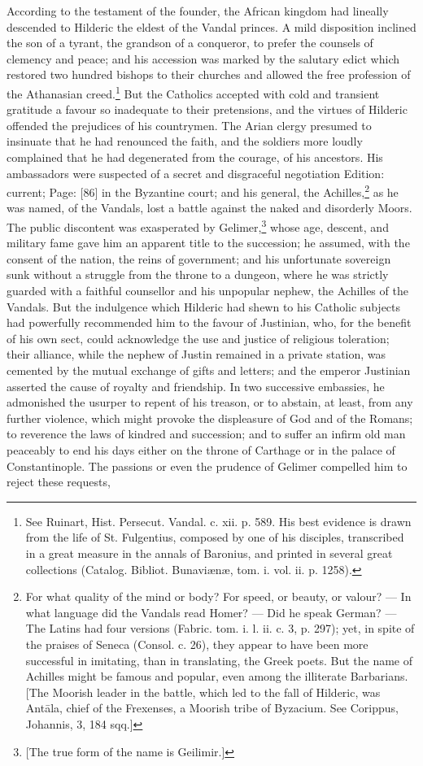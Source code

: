 According to the testament of the founder, the African kingdom had lineally descended to Hilderic the eldest of the Vandal princes. A mild disposition inclined the son of a tyrant, the grandson of a conqueror, to prefer the counsels of clemency and peace; and his accession was marked by the salutary edict which restored two hundred bishops to their churches and allowed the free profession of the Athanasian creed.\footnote{See Ruinart, Hist. Persecut. Vandal. c. xii. p. 589. His best evidence is drawn from the life of St. Fulgentius, composed by one of his disciples, transcribed in a great measure in the annals of Baronius, and printed in several great collections (Catalog. Bibliot. Bunaviænæ, tom. i. vol. ii. p. 1258).} But the Catholics accepted with cold and transient gratitude a favour so inadequate to their pretensions, and the virtues of Hilderic offended the prejudices of his countrymen. The Arian clergy presumed to insinuate that he had renounced the faith, and the soldiers more loudly complained that he had degenerated from the courage, of his ancestors. His ambassadors were suspected of a secret and disgraceful negotiation Edition: current; Page: [86] in the Byzantine court; and his general, the Achilles,\footnote{For what quality of the mind or body? For speed, or beauty, or valour? \texthebrew{—} In what language did the Vandals read Homer? \texthebrew{—} Did he speak German? \texthebrew{—} The Latins had four versions (Fabric. tom. i. l. ii. c. 3, p. 297); yet, in spite of the praises of Seneca (Consol. c. 26), they appear to have been more successful in imitating, than in translating, the Greek poets. But the name of Achilles might be famous and popular, even among the illiterate Barbarians. [The Moorish leader in the battle, which led to the fall of Hilderic, was Antāla, chief of the Frexenses, a Moorish tribe of Byzacium. See Corippus, Johannis, 3, 184 sqq.]} as he was named, of the Vandals, lost a battle against the naked and disorderly Moors. The public discontent was exasperated by Gelimer,\footnote{[The true form of the name is Geilimir.]} whose age, descent, and military fame gave him an apparent title to the succession; he assumed, with the consent of the nation, the reins of government; and his unfortunate sovereign sunk without a struggle from the throne to a dungeon, where he was strictly guarded with a faithful counsellor and his unpopular nephew, the Achilles of the Vandals. But the indulgence which Hilderic had shewn to his Catholic subjects had powerfully recommended him to the favour of Justinian, who, for the benefit of his own sect, could acknowledge the use and justice of religious toleration; their alliance, while the nephew of Justin remained in a private station, was cemented by the mutual exchange of gifts and letters; and the emperor Justinian asserted the cause of royalty and friendship. In two successive embassies, he admonished the usurper to repent of his treason, or to abstain, at least, from any further violence, which might provoke the displeasure of God and of the Romans; to reverence the laws of kindred and succession; and to suffer an infirm old man peaceably to end his days either on the throne of Carthage or in the palace of Constantinople. The passions or even the prudence of Gelimer compelled him to reject these requests, 